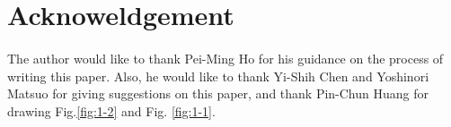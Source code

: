 \documentclass[letterpaper,12pt]{article}
\begin{document}
\section{Acknoweldgement}
\paragraph{ }
The author would like to thank Pei-Ming Ho for his
guidance on the process of writing this paper. Also, he would like to thank Yi-Shih Chen and Yoshinori Matsuo for giving suggestions on this paper, and thank Pin-Chun Huang for drawing Fig.\ref{fig:1-2} and Fig. \ref{fig:1-1}. 





\end{document}
